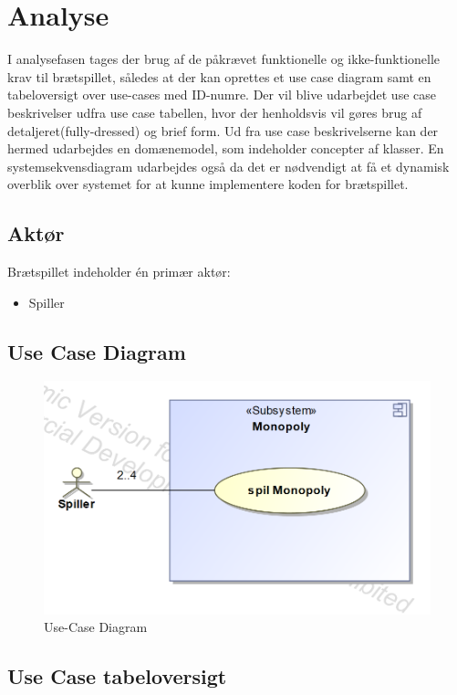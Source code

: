 \documentclass[../main.tex]{subfiles}
\begin{document}
\section{Analyse}

\begin{flushleft} 
I analysefasen tages der brug af de påkrævet funktionelle og ikke-funktionelle krav til brætspillet, således at der kan oprettes et use case diagram samt en tabeloversigt over use-cases med ID-numre. 
Der vil blive udarbejdet use case beskrivelser udfra use case tabellen, hvor der henholdsvis vil gøres brug af detaljeret(fully-dressed) og brief form.
Ud fra use case beskrivelserne kan der hermed udarbejdes en domænemodel, som indeholder concepter af klasser.
En systemsekvensdiagram udarbejdes også da det er nødvendigt at få et dynamisk overblik over systemet for at kunne implementere koden for brætspillet.
\end{flushleft}


\subsection{Aktør}
Brætspillet indeholder én primær aktør:
\begin{itemize}
  \item  Spiller
\end{itemize}


\subsection{Use Case Diagram}
\begin{figure}[H]
    \centering
    \includegraphics[width=0.6\linewidth]{figures/use-case_Diagram.png}
    \caption{Use-Case Diagram}
    \label{fig:UCDia}
\end{figure}

\newpage 

\subsection{Use Case tabeloversigt}
\end{document}
